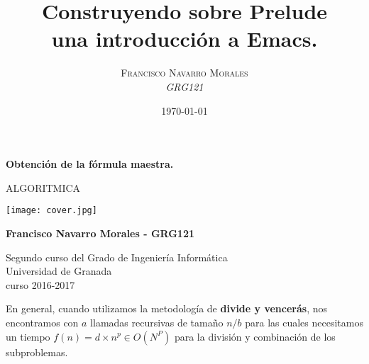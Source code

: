 \documentclass[a4paper, 11pt]{article}
\title{\textbf{Construyendo sobre Prelude}\\ %
					una introducción a Emacs.} %
\author{\textsc{Francisco Navarro Morales} %
\\{\textit{GRG121}}} %
\date{\today} %
\makeatletter
\renewcommand{\maketitle}{
  \begin{flushright} %
  
  {\LARGE\@title} %
  
  \vspace{50pt} %
  
  {\large\@author} %
  \\\@date %
  \vspace{40pt} %
  \end{flushright}
}
\makeatother
\begin{document}
	
	
	\begin{titlepage}
		\begin{center}
			\vspace*{2cm}
			
			{\Huge \textbf{Obtención de la fórmula maestra.}}
			
			 ALGORITMICA 
			
			
			\vspace{0.5cm}
			
			
		    \centering \texttt{[image: cover.jpg]}
		  
			
			\vspace{2cm}
			
			\textbf{Francisco Navarro Morales - GRG121 }
			
			\vfill
			
			Segundo curso del Grado de Ingeniería Informática\\
			Universidad de Granada\\
			curso 2016-2017\\
			
		\end{center}
	\end{titlepage}



\renewcommand{\abstractname}{Resumen} %





\pagebreak
En general, cuando utilizamos la metodología de \textbf{divide y vencerás}, nos encontramos con $a$ llamadas recursivas de tamaño $n/b$ para las cuales necesitamos un tiempo $f(n)=d \times n^p \in O(N^P)$ para la división y combinación de los subproblemas. 
\end{document}
